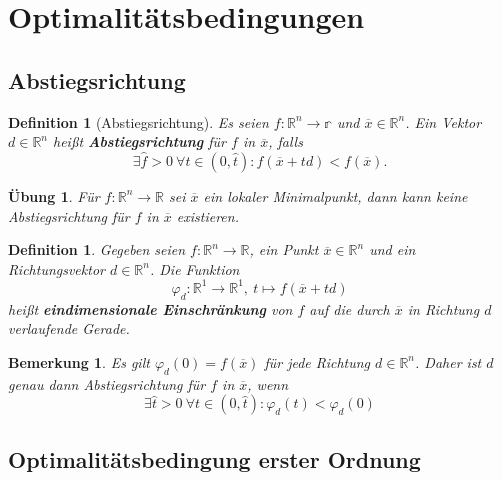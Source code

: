 \documentclass[11pt]{scrreprt}
\newcounter{thm}
\theoremstyle{thmstyle}
\numberwithin{thm}{section}
\newtheorem{definition}[thm]{Definition}
\newtheorem{uebung}[thm]{Übung}
\newtheorem*{bemerkung*}{Bemerkung}
\begin{document}
\setcounter{chapter}{2}
\setcounter{section}{1}

\newpage

\section*{Optimalitätsbedingungen}

\subsection*{Abstiegsrichtung}

\setcounter{thm}{0}

\begin{definition}[Abstiegsrichtung]
	Es seien $f \colon \mathbb{R}^n \rightarrow \mathbb{r}$ und $\overline{x} \in \mathbb{R}^n$. Ein Vektor $d \in \mathbb{R}^n$ heißt \textbf{Abstiegsrichtung} für $f$ in $\overline{x}$, falls
	$$ \exists \hat{f} > 0 ~\forall t \in (0, \hat{t}) \colon f(\overline{x} + td) < f(\overline{x}). $$
\end{definition}

\begin{uebung}
	Für $f \colon \mathbb{R}^n \rightarrow \mathbb{R}$ sei $\overline{x}$ ein lokaler Minimalpunkt, dann kann keine Abstiegsrichtung für $f$ in $\overline{x}$ existieren.
\end{uebung}

\begin{definition}
	Gegeben seien $f \colon \mathbb{R}^n \rightarrow \mathbb{R}$, ein Punkt $\overline{x} \in \mathbb{R}^n$ und ein Richtungsvektor $d \in \mathbb{R}^n$. Die Funktion
	$$ \varphi_d \colon \mathbb{R}^1 \rightarrow
	 \mathbb{R}^1, ~ t \mapsto f(\overline{x} + td) $$
	 heißt \textbf{eindimensionale Einschränkung} von $f$ auf die durch $\overline{x}$ in Richtung $d$ verlaufende Gerade.
\end{definition}

\begin{bemerkung*}
		Es gilt $\varphi_d(0) = f(\overline{x})$ für jede Richtung $d \in \mathbb{R}^n$. Daher ist $d$ genau dann Abstiegsrichtung für $f$ in $\overline{x}$, wenn
		$$ \exists \hat{t} > 0 ~\forall t \in (0, \hat{t}) \colon \varphi_d(t) < \varphi_d(0) $$
\end{bemerkung*}

\subsection*{Optimalitätsbedingung erster Ordnung}
\end{document}
